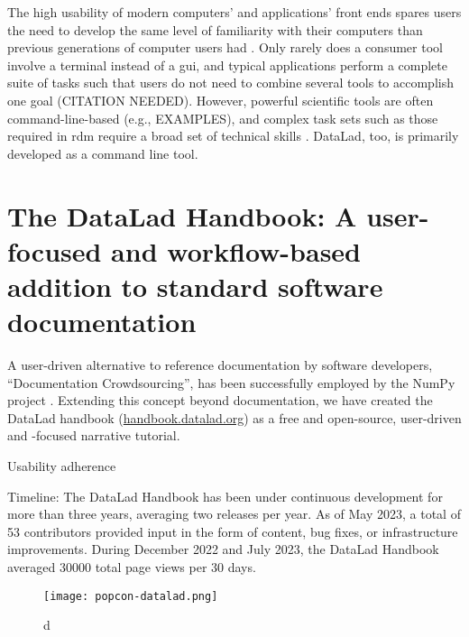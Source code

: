 The high usability of modern computers' and applications' front ends spares users the need to develop the same level of familiarity with their computers than previous generations of computer users had \citep{mehlenbacher2003documentation}.
Only rarely does a consumer tool involve a terminal instead of a \gls{gui}, and typical applications perform a complete suite of tasks such that users do not need to combine several tools to accomplish one goal (CITATION NEEDED).
However, powerful scientific tools are often command-line-based (e.g., EXAMPLES), and complex task sets such as those required in \gls{rdm} require a broad set of technical skills \citep{grisham2016proposed}.
DataLad, too, is primarily developed as a command line tool.

\pagebreak

\section{The DataLad Handbook: A user-focused and workflow-based addition to standard software documentation}

A user-driven alternative to reference documentation by software developers, ``Documentation Crowdsourcing'', has been successfully employed by the NumPy project \citep{pawlik2014crowdsourcing}.
Extending this concept beyond documentation, we have created the DataLad handbook (\href{http://handbook.datalad.org}{handbook.datalad.org}) as a free and open-source, user-driven and -focused narrative tutorial.


Usability adherence

Timeline:
The DataLad Handbook has been under continuous development for more than three years, averaging two releases per year.
As of May 2023, a total of 53 contributors provided input in the form of content, bug fixes, or infrastructure improvements.
During December 2022 and July 2023, the DataLad Handbook averaged 30000 total page views per 30 days.


\begin{figure}
	\texttt{[image: popcon-datalad.png]}
	\caption{d}
	\label{fig:popcon}
\end{figure}

\pagebreak

